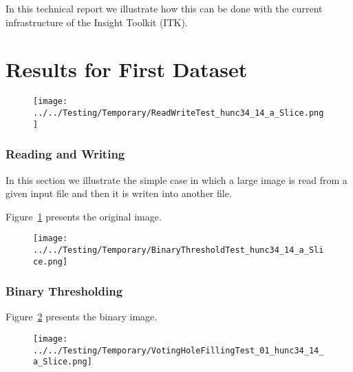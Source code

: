 \documentclass{InsightArticle}
\begin{document}
In this technical report we illustrate how this can be done with the current
infrastructure of the Insight Toolkit (ITK).

\part{Results for First Dataset}

\clearpage
\begin{figure}
\center
\texttt{[image: ../../Testing/Temporary/ReadWriteTest\_hunc34\_14\_a\_Slice.png]}
\label{fig:OriginalImage}
\end{figure}

\section{Reading and Writing}

In this section we illustrate the simple case in which a large image is read
from a given input file and then it is writen into another file.

\begin{center}

\end{center}

Figure~\ref{fig:OriginalImage} presents the original image.



\clearpage
\begin{figure}
\center
\texttt{[image: ../../Testing/Temporary/BinaryThresholdTest\_hunc34\_14\_a\_Slice.png]}
\label{fig:BinaryImage}
\end{figure}

\section{Binary Thresholding}

\begin{center}

\end{center}

Figure~\ref{fig:BinaryImage} presents the binary image.



\clearpage
\begin{figure}
\center
\texttt{[image: ../../Testing/Temporary/VotingHoleFillingTest\_01\_hunc34\_14\_a\_Slice.png]}
\label{fig:IslandRemovalImage}
\end{figure}
\end{document}
